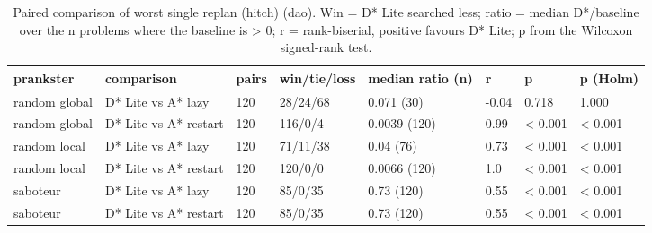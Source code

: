 \begin{table}[t]
\centering
\small
\caption{Paired comparison of worst single replan (hitch) (dao). Win = D* Lite searched less; ratio = median D*/baseline over the n problems where the baseline is > 0; r = rank-biserial, positive favours D* Lite; p from the Wilcoxon signed-rank test.}
\label{tab:tests-hitch-dao}
\begin{tabular}{llllllll}
\toprule
prankster & comparison & pairs & win/tie/loss & median ratio (n) & r & p & p (Holm) \\
\midrule
random global & D* Lite vs A* lazy & 120 & 28/24/68 & 0.071 (30) & -0.04 & 0.718 & 1.000 \\
random global & D* Lite vs A* restart & 120 & 116/0/4 & 0.0039 (120) & 0.99 & < 0.001 & < 0.001 \\
random local & D* Lite vs A* lazy & 120 & 71/11/38 & 0.04 (76) & 0.73 & < 0.001 & < 0.001 \\
random local & D* Lite vs A* restart & 120 & 120/0/0 & 0.0066 (120) & 1.0 & < 0.001 & < 0.001 \\
saboteur & D* Lite vs A* lazy & 120 & 85/0/35 & 0.73 (120) & 0.55 & < 0.001 & < 0.001 \\
saboteur & D* Lite vs A* restart & 120 & 85/0/35 & 0.73 (120) & 0.55 & < 0.001 & < 0.001 \\
\bottomrule
\end{tabular}
\end{table}
